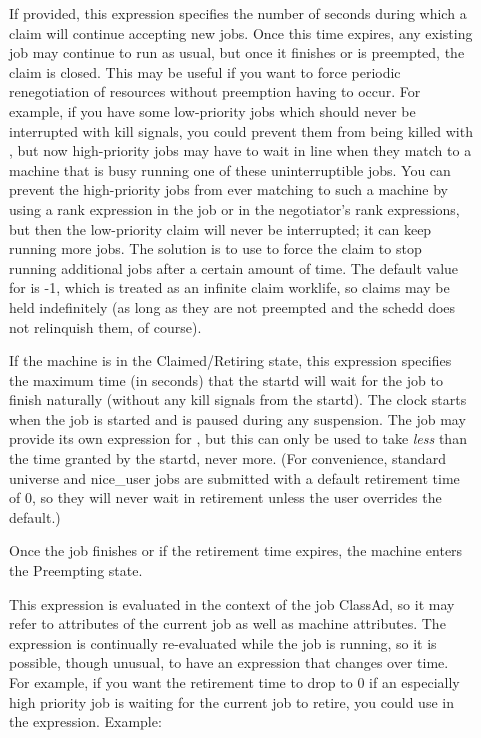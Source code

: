 \begin{description}
\item[] If provided, this expression specifies
the number of seconds during which a claim will continue accepting new
jobs.  Once this time expires, any existing job may continue to run as
usual, but once it finishes or is preempted, the claim is closed.
This may be useful if you want to force periodic renegotiation of
resources without preemption having to occur.  For example, if you
have some low-priority jobs which should never be interrupted with
kill signals, you could prevent them from being killed with
, but now high-priority jobs may have to
wait in line when they match to a machine that is busy running one of
these uninterruptible jobs.  You can prevent the high-priority jobs
from ever matching to such a machine by using a rank expression in the
job or in the negotiator's rank expressions, but then the low-priority
claim will never be interrupted; it can keep running more jobs.  The
solution is to use  to force the claim to stop
running additional jobs after a certain amount of time.
The default value for  is -1, which is treated
as an infinite claim worklife, so claims may be held indefinitely (as
long as they are not preempted and the schedd does not relinquish
them, of course).

\item[] If the machine is in the
Claimed/Retiring state, this expression specifies the maximum time (in
seconds) that the startd will wait for the job to finish naturally
(without any kill signals from the startd).  The clock starts when the
job is started and is paused during any suspension.  The job may
provide its own expression for , but this
can only be used to take \emph{less} than the time granted by the
startd, never more.  (For convenience, standard universe and
nice\_user jobs are submitted with a default retirement time of 0, so
they will never wait in retirement unless the user overrides the
default.)

Once the job finishes or if the retirement time expires, the machine
enters the Preempting state.

This expression is evaluated in the context of the job ClassAd, so it
may refer to attributes of the current job as well as machine
attributes.  The expression is continually re-evaluated while the job
is running, so it is possible, though unusual, to have an expression
that changes over time.  For example, if you want the retirement time
to drop to 0 if an especially high priority job is waiting for the
current job to retire, you could use  in the
expression.  Example:


\end{description}
